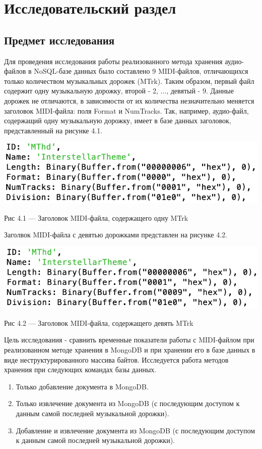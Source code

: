 \chapter{Исследовательский раздел}

\section{Предмет исследования}

Для проведения исследования работы реализованного метода хранения аудио-файлов в NoSQL-базе данных было составлено 9 MIDI-файлов, отличающихся только количеством музыкальных дорожек (MTrk). Таким образом, первый файл содержит одну музыкальную дорожку, второй - 2, ..., девятый - 9. Данные дорожек не отличаются, в зависимости от их количества незначительно меняется заголовок MIDI-файла: поля Format и NumTracks.
Так, например, аудио-файл, содержащий одну музыкальную дорожку, имеет в базе данных заголовок, представленный на рисунке 4.1.

\begin{center}
		\includegraphics[scale=0.6]{tex/img/OneTrack.png}
		
			Рис 4.1 — Заголовок MIDI-файла, содержащего одну MTrk
\end{center}

Заголвок MIDI-файла с девятью дорожками представлен на рисунке 4.2.
\begin{center}
		\includegraphics[scale=0.6]{tex/img/NineTracks.png}
		
			Рис 4.2 — Заголовок MIDI-файла, содержащего девять MTrk
\end{center}

Цель исследования - сравнить временные показатели работы с MIDI-файлом при реализованном методе хранения в MongoDB и при хранении его в базе данных в виде неструктурированного массива байтов. Исследуется работа методов хранения при следующих командах базы данных.
\begin{enumerate}
\item Только добавление документа в MongoDB.
\item Только извлечение документа из MongoDB (с последующим доступом к данным самой последней музыкальной дорожки).
\item Добавление и извлечение документа из MongoDB (с последующим доступом к данным самой последней музыкальной дорожки).
\end{enumerate}

